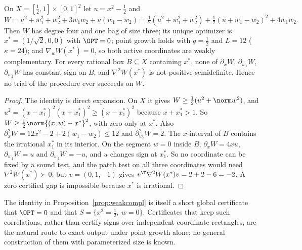 \begin{proposition}\label{prop:weakcompl}
On $X=[\frac12,1]\times[0,1]^2$ let $u=x^2-\frac12$ and
\[
W=u^2+w_1^2+w_2^2+3w_1w_2+u(w_1-w_2)
=\tfrac12(u^2+w_1^2+w_2^2)+\tfrac12(u+w_1-w_2)^2+4w_1w_2 .
\]
Then $W$ has degree four and one bag of size three; its unique optimizer is
$x^*=(1/\sqrt2,0,0)$ with $\OPT=0$; point growth holds with $g=\frac12$ and
$L=12$ ($\kappa=24$); and $\nabla_wW(x^*)=0$, so both active coordinates are
weakly complementary. For every rational box $B\subseteq X$ containing $x^*$,
none of $\partial_xW$, $\partial_{w_1}W$, $\partial_{w_2}W$ has constant sign on
$B$, and $\nabla^2W(x^*)$ is not positive semidefinite. Hence no trial of the
procedure ever succeeds on $W$.
\end{proposition}

\begin{proof}
The identity is direct expansion. On $X$ it gives $W\ge\frac12(u^2+\norm w^2)$,
and $u^2=(x-x^*_1)^2(x+x^*_1)^2\ge(x-x^*_1)^2$ because $x+x^*_1>1$. So
$W\ge\frac12\norm{(x,w)-x^*}^2$, with zero only at $x^*$. Also
$\partial_x^2W=12x^2-2+2(w_1-w_2)\le12$ and $\partial_{w_i}^2W=2$. The
$x$-interval of $B$ contains the irrational $x^*_1$ in its interior. On the
segment $w=0$ inside $B$, $\partial_xW=4xu$, $\partial_{w_1}W=u$ and
$\partial_{w_2}W=-u$, and $u$ changes sign at $x^*_1$. So no coordinate can be
fixed by a sound test, and the patch test on all three coordinates would
need $\nabla^2W(x^*)\succ0$; but $v=(0,1,-1)$ gives
$v^{\T}\nabla^2W(x^*)v=2+2-6=-2$. A zero certified gap is impossible
because $x^*$ is irrational.
\end{proof}

The identity in Proposition~\ref{prop:weakcompl} is itself a short global
certificate that $\OPT=0$ and that $S=\{x^2=\frac12,\ w=0\}$. Certificates
that keep such correlations, rather than certify signs over independent
coordinate rectangles, are the natural route to exact output under point
growth alone; no general construction of them with parameterized size is
known.
